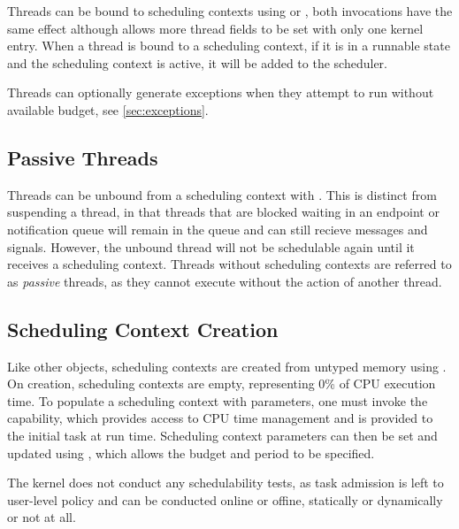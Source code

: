 Threads can be bound to scheduling contexts using  or 
, both invocations have the same effect although  allows more thread fields to be set with only one kernel entry. 
When a thread is bound to a scheduling context, if it is in a runnable state and the scheduling context is active, it will be added to the scheduler.

Threads can optionally generate exceptions when they attempt to run without available budget, see \autoref{sec:exceptions}.

\subsection{Passive Threads}
\label{sec:passive}

Threads can be unbound from a scheduling context with . 
This is distinct from suspending a thread, in that threads that are blocked waiting in an endpoint or notification queue will remain 
in the queue and can still recieve messages and signals. 
However, the unbound thread will not be schedulable again until it receives a scheduling context.
Threads without scheduling contexts are referred to as \emph{passive} threads, as they cannot execute without the action of another thread. 

\subsection{Scheduling Context Creation}
\label{sec:sc_creation}

Like other objects, scheduling contexts are created from untyped memory using .
On creation, scheduling contexts are empty, representing 0\% of CPU execution time.
To populate a scheduling context with parameters, one must invoke the  capability, which provides access to CPU time management and is provided to the initial task at run time.
Scheduling context parameters can then be set and updated using , which allows the budget and period to be specified.

The kernel does not conduct any schedulability tests, as task admission is left to user-level policy and can be conducted online or offine, statically or dynamically or not at all. 

